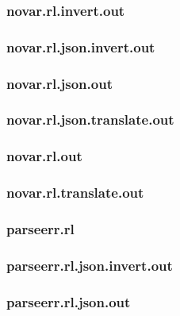 \subsubsection{novar.rl.invert.out}
\label{app:novar_rl.invert.out}

\subsubsection{novar.rl.json.invert.out}
\label{app:novar_rl.json.invert.out}

\subsubsection{novar.rl.json.out}
\label{app:novar_rl.json.out}

\subsubsection{novar.rl.json.translate.out}
\label{app:novar_rl.json.translate.out}

\subsubsection{novar.rl.out}
\label{app:novar_rl.out}

\subsubsection{novar.rl.translate.out}
\label{app:novar_rl.translate.out}

\subsubsection{parseerr.rl}
\label{app:parseerr_rl}

\subsubsection{parseerr.rl.json.invert.out}
\label{app:parseerr_rl.json.invert.out}

\subsubsection{parseerr.rl.json.out}
\label{app:parseerr_rl.json.out}

